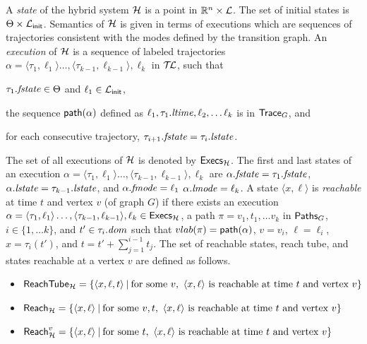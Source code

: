 A {\em state\/} of the hybrid system ${\mathcal H}$ is a point in $\reals^n \times \L$. 
%
The set of initial states is $\Theta \times {\mathcal L}_{\sf init}$.  Semantics
of ${\mathcal H}$ is given in terms of executions which are sequences of
trajectories consistent with the modes defined by the transition
graph.  An {\em execution\/} of ${\mathcal H}$ is a sequence of labeled
trajectories $\alpha = \langle \tau_1, \ell_1\rangle\ldots, \langle
\tau_{k-1}, \ell_{k-1}\rangle, \ell_k$ in $\mathcal{T\mkern-3mu L}$, such that
\begin{inparaenum}[(a)]
	\item $\tau_1.\mathit{fstate} \in \Theta$ and  $\ell_1 \in {\mathcal L}_{\sf init}$,
	\item the sequence $\pathof{\alpha}$ defined as $\ell_1, \tau_1.\mathit{ltime}, \ell_2, \ldots \ell_k$ is in $\traces{G}$, and
	\item for each consecutive trajectory, $\tau_{i+1}.\mathit{fstate} =
          \tau_i.\mathit{lstate}$.
\end{inparaenum}
The set of all executions of ${\mathcal H}$ is denoted by $\execs{\H}$.  The
first and last states of an execution $\alpha = \langle \tau_1,
\ell_1\rangle\ldots, \langle \tau_{k-1}, \ell_{k-1}\rangle, \ell_k$
are $\alpha.\mathit{fstate} = \tau_1.\mathit{fstate}$, $\alpha.\mathit{lstate} =
\tau_{k-1}.\mathit{lstate}$, and $\alpha.\mathit{fmode} = \ell_1$ $\alpha.\mathit{lmode} =
\ell_k$.  A state $\langle x, \ell \rangle$ is {\em reachable\/} at
time $t$ and vertex $v$ (of graph $G$) if there exists an execution
$\alpha = \langle \tau_1, \ell_1\rangle\ldots, \langle \tau_{k-1},
\ell_{k-1}\rangle, \ell_k \in \execs{\H}$, a path $\pi = v_1, t_1,
\ldots v_k$ in $\paths{G}$, $i \in \{1,\ldots k\}$, and $t' \in
\tau_i.{\mathit dom}$ such that $\vertlab(\pi) = \pathof{\alpha}$, $v = v_i$,
$\ell = \ell_i$, $x = \tau_i(t')$, and $t = t' + \sum_{j=1}^{i-1} t_j$.
%
The set of reachable states, reach tube, and states reachable at a
vertex $v$ are defined as follows.

\begin{itemize}[\null]
\itemsep0pt 
\item ${\sf ReachTube}_{{\mathcal H}} = \{\langle x,\ell,t \rangle\: |\: \mbox{for some }
v,\ \langle x, \ell \rangle \mbox{ is reachable at time $t$ and vertex
  $v$}\}$
\item $\reach{\H} = \{\langle x,\ell \rangle\: |\: \mbox{for some }
v,t,\ \langle x, \ell \rangle \mbox{ is reachable at time $t$ and
  vertex $v$}\}$
\item $\reach{\H}^v = \{\langle x,\ell \rangle\: |\: \mbox{for some }
t,\ \langle x, \ell \rangle \mbox{ is reachable at time $t$ and
  vertex $v$}\}$
\end{itemize}

